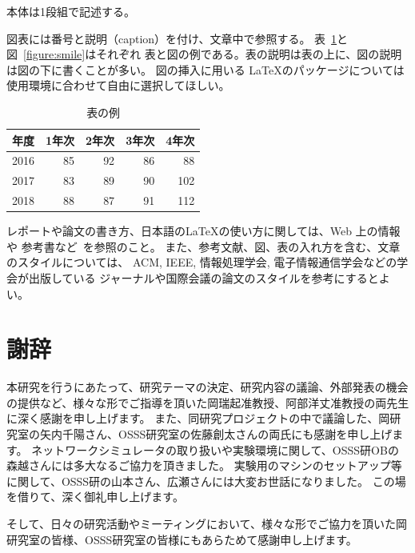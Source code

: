 \documentclass[a4paper,11pt]{jreport}
\begin{document}
本体は1段組で記述する。

図表には番号と説明（caption）を付け、文章中で参照する。
表~\ref{table:scores}と図~\ref{figure:smile}はそれぞれ
表と図の例である。表の説明は表の上に、図の説明は図の下に書くことが多い。
図の挿入に用いる \LaTeX のパッケージについては使用環境に合わせて自由に選択してほしい。

\begin{table}[hbt]
\caption{表の例}
\label{table:scores}
\begin{center}
\begin{tabular}{|c|r|r|r|r|}
\hline
年度 & 1年次 & 2年次 & 3年次 & 4年次 \\
\hline
2016 & 85 & 92 & 86 &  88 \\
2017 & 83 & 89 & 90 & 102 \\
2018 & 88 & 87 & 91 & 112 \\
\hline
\end{tabular}
\end{center}
\end{table}
\medskip

レポートや論文の書き方、日本語の\LaTeX の使い方に関しては、Web 上の情報や
参考書など~\cite{Bibunsho,ScienceResearchWriting}を参照のこと。
また、参考文献、図、表の入れ方を含む、文章のスタイルについては、
ACM, IEEE, 情報処理学会, 電子情報通信学会などの学会が出版している
ジャーナルや国際会議の論文のスタイルを参考にするとよい。

\chapter*{謝辞}

本研究を行うにあたって、研究テーマの決定、研究内容の議論、外部発表の機会の提供など、様々な形でご指導を頂いた岡瑞起准教授、阿部洋丈准教授の両先生に深く感謝を申し上げます。
また、同研究プロジェクトの中で議論した、岡研究室の矢内千陽さん、OSSS研究室の佐藤創太さんの両氏にも感謝を申し上げます。
ネットワークシミュレータの取り扱いや実験環境に関して、OSSS研OBの森越さんには多大なるご協力を頂きました。
実験用のマシンのセットアップ等に関して、OSSS研の山本さん、広瀬さんには大変お世話になりました。
この場を借りて、深く御礼申し上げます。

そして、日々の研究活動やミーティングにおいて、様々な形でご協力を頂いた岡研究室の皆様、OSSS研究室の皆様にもあらためて感謝申し上げます。

\newpage

\renewcommand{\bibname}{参考文献}



\end{document}
